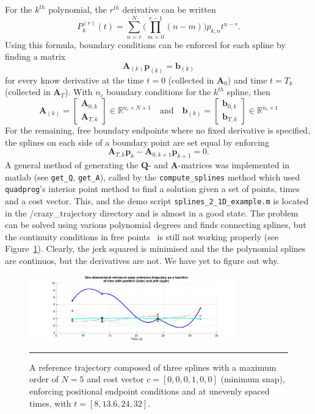 \documentclass{article}
\begin{document}
For the $k^{th}$ polynomial, the $r^{th}$ derivative can be written
\begin{equation}
P_k^{(r)}(t) = \sum_{n=r}^N\Big(\prod_{m=0}^{r-1}(n-m)\Big)p_{k,n}t^{n-r}.
\end{equation}
Using this formula, boundary conditions can be enforced for each spline by finding a matrix 
\begin{equation}
\mathbf{A}_{(k)}
\mathbf{p}_{(k)} = 
\mathbf{b}_{(k)}
\end{equation}
for every know derivative at the time $t=0$ (collected in $\mathbf{A}_0$) and time $t=T_k$ (collected in $\mathbf{A}_T$). With $n_c$ boundary conditions for the $k^{th}$ spline, then
\begin{equation}
\mathbf{A}_{(k)} = 
\begin{bmatrix}\mathbf{A}_{0,k}\\
\mathbf{A}_{T,k}
\end{bmatrix}\in\mathbb{R}^{n_c\times N+1}
\quad\text{and}\quad
\mathbf{b}_{(k)} = 
\begin{bmatrix}\mathbf{b}_{0,k}\\
\mathbf{b}_{T,k}
\end{bmatrix}\in\mathbb{R}^{n_c\times1}
\end{equation}
For the remaining, free boundary endpoints where no fixed derivative is specified, the splines on each side of a boundary point are set equal by enforcing
\begin{equation}\label{eq:cont}
\mathbf{A}_{T,k}\mathbf{p}_k - \mathbf{A}_{0,k+1}\mathbf{p}_{k+1}=0.
\end{equation}
A general method of generating the $\mathbf{Q}$- and $\mathbf{A}$-matrices was implemented in matlab (see \texttt{get\_Q}, \texttt{get\_A}), called by the \texttt{compute\_splines} method which used \texttt{quadprog}'s interior point method to find a solution given a set of points, times and a cost vector. This, and the demo script \texttt{splines\_2\_1D\_example.m} is located in the /crazy\_trajectory directory and is almost in a good state. The problem can be solved using various polynomial degrees and finds connecting splines, but the continuity conditions in free points~\label{eq:cont} is still not working properly (see Figure~\ref{fig:splines}). Clearly, the jerk squared is minimised and the the polynomial splines are continuos, but the derivatives are not. We have yet to figure out why.
\begin{figure}[htbp]
\centering
\includegraphics[width=0.8\textwidth]{figures/Splines.png}
\rule{35em}{0.5pt}
\caption{A reference trajectory composed of three splines with a maximum order of $N = 5$ and cost vector $c = [0,0,0,1,0,0]$ (minimum snap), enforcing positional endpoint conditions and at unevenly spaced times, with $t = [8,13.6,24,32]$.}
\label{fig:splines}
\end{figure}
\end{document}
